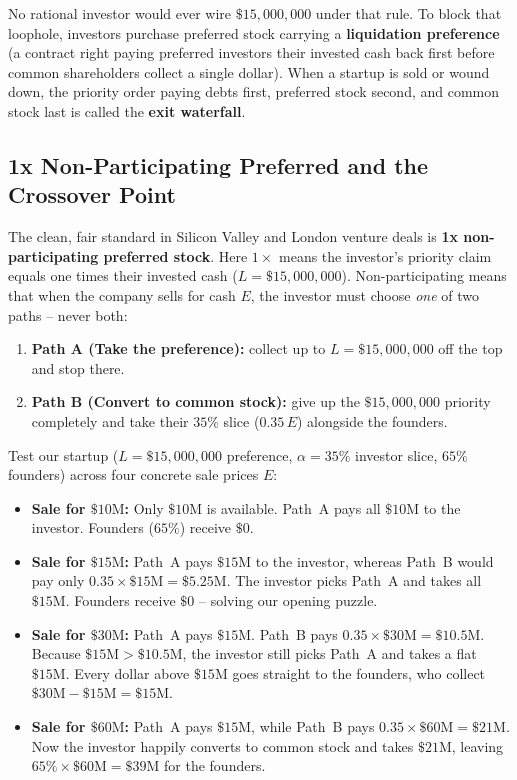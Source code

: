 No rational investor would ever wire $\$15{,}000{,}000$ under that rule. To block that loophole, investors purchase preferred stock carrying a \textbf{liquidation preference} (a contract right paying preferred investors their invested cash back first before common shareholders collect a single dollar). When a startup is sold or wound down, the priority order paying debts first, preferred stock second, and common stock last is called the \textbf{exit waterfall}.

\subsection{1x Non-Participating Preferred and the Crossover Point}
\label{subsec:non-participating-preferred}

The clean, fair standard in Silicon Valley and London venture deals is \textbf{1x non-participating preferred stock}. Here $1\times$ means the investor's priority claim equals one times their invested cash ($L = \$15{,}000{,}000$). Non-participating means that when the company sells for cash $E$, the investor must choose \emph{one} of two paths -- never both:
\begin{enumerate}
  \item \textbf{Path A (Take the preference):} collect up to $L = \$15{,}000{,}000$ off the top and stop there.
  \item \textbf{Path B (Convert to common stock):} give up the $\$15{,}000{,}000$ priority completely and take their $35\%$ slice ($0.35\,E$) alongside the founders.
\end{enumerate}

Test our startup ($L = \$15{,}000{,}000$ preference, $\alpha = 35\%$ investor slice, $65\%$ founders) across four concrete sale prices $E$:
\begin{itemize}
  \item \textbf{Sale for $\$10\text{M}$:} Only $\$10\text{M}$ is available. Path~A pays all $\$10\text{M}$ to the investor. Founders ($65\%$) receive $\$0$.
  \item \textbf{Sale for $\$15\text{M}$:} Path~A pays $\$15\text{M}$ to the investor, whereas Path~B would pay only $0.35 \times \$15\text{M} = \$5.25\text{M}$. The investor picks Path~A and takes all $\$15\text{M}$. Founders receive $\$0$ -- solving our opening puzzle.
  \item \textbf{Sale for $\$30\text{M}$:} Path~A pays $\$15\text{M}$. Path~B pays $0.35 \times \$30\text{M} = \$10.5\text{M}$. Because $\$15\text{M} > \$10.5\text{M}$, the investor still picks Path~A and takes a flat $\$15\text{M}$. Every dollar above $\$15\text{M}$ goes straight to the founders, who collect $\$30\text{M} - \$15\text{M} = \$15\text{M}$.
  \item \textbf{Sale for $\$60\text{M}$:} Path~A pays $\$15\text{M}$, while Path~B pays $0.35 \times \$60\text{M} = \$21\text{M}$. Now the investor happily converts to common stock and takes $\$21\text{M}$, leaving $65\% \times \$60\text{M} = \$39\text{M}$ for the founders.
\end{itemize}

